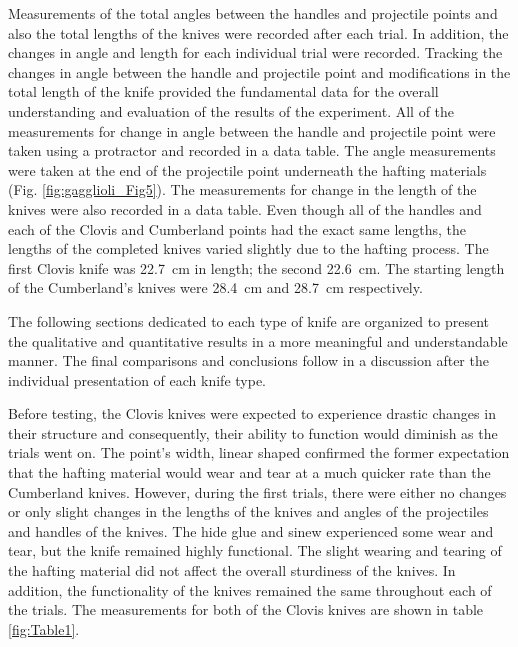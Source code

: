 Measurements of the total angles between the handles and projectile points and also the total lengths of the knives were recorded after each trial. In addition, the changes in angle and length for each individual trial were recorded. 
Tracking the changes in angle between the handle and projectile point and modifications in the total length of the knife provided the fundamental data for the overall understanding and evaluation of the results of the experiment. All of the measurements for change in angle between the handle and projectile point were taken using a protractor and recorded in a data table. The angle measurements were taken at the end of the projectile point underneath the hafting materials (Fig. \ref{fig:gagglioli_Fig5}). 
The measurements for change in the length of the knives were also recorded in a data table. Even though all of the handles and each of the Clovis and Cumberland points had the exact same lengths, the lengths of the completed knives varied slightly due to the hafting process. The first Clovis knife was \SI{22.7}{\centi\metre} in length; the second \SI{22.6}{\centi\metre}. The starting length of the Cumberland’s knives were \SI{28.4}{\centi\metre} and \SI{28.7}{\centi\metre} respectively.


The following sections dedicated to each type of knife are organized to present the qualitative and quantitative results in a more meaningful and understandable manner. The final comparisons and conclusions follow in a discussion after the individual presentation of each knife type. 

Before testing, the Clovis knives were expected to experience drastic changes in their structure and consequently, their ability to function would diminish as the trials went on. The point’s width, linear shaped confirmed the former expectation that the hafting material would wear and tear at a much quicker rate than the Cumberland knives. However, during the first trials, there were either no changes or only slight changes in the lengths of the knives and angles of the projectiles and handles of the knives. The hide glue and sinew experienced some wear and tear, but the knife remained highly functional. The slight wearing and tearing of the hafting material did not affect the overall sturdiness of the knives. In addition, the functionality of the knives remained the same throughout each of the trials. The measurements for both of the Clovis knives are shown in table \ref{fig:Table1}.

